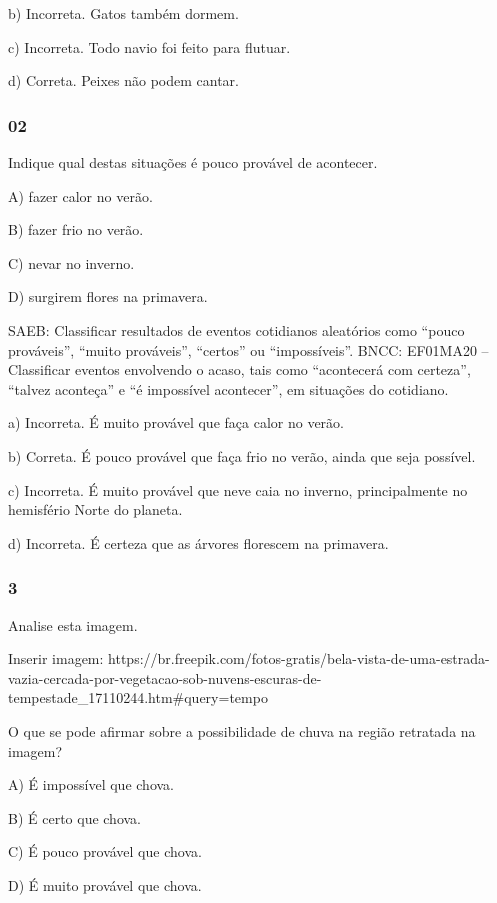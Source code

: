 b) Incorreta. Gatos também dormem.

c) Incorreta. Todo navio foi feito para flutuar.

d) Correta. Peixes não podem cantar.

\subsubsection{02}\label{section-74}

Indique qual destas situações é pouco provável de acontecer.

A) fazer calor no verão.

B) fazer frio no verão.

C) nevar no inverno.

D) surgirem flores na primavera.

SAEB: Classificar resultados de eventos cotidianos aleatórios como
``pouco prováveis'', ``muito prováveis'', ``certos'' ou ``impossíveis''.
BNCC: EF01MA20 -- Classificar eventos envolvendo o acaso, tais como
``acontecerá com certeza'', ``talvez aconteça'' e ``é impossível
acontecer'', em situações do cotidiano.

a) Incorreta. É muito provável que faça calor no verão.

b) Correta. É pouco provável que faça frio no verão, ainda que seja
possível.

c) Incorreta. É muito provável que neve caia no inverno, principalmente
no hemisfério Norte do planeta.

d) Incorreta. É certeza que as árvores florescem na primavera.

\subsubsection{3}\label{section-75}

Analise esta imagem.

Inserir imagem: https://br.freepik.com/fotos-gratis/bela-vista-de-uma-estrada-vazia-cercada-por-vegetacao-sob-nuvens-escuras-de-tempestade_17110244.htm#query=tempo%

O que se pode afirmar sobre a possibilidade de chuva na região retratada na imagem?

A) É impossível que chova.

B) É certo que chova.

C) É pouco provável que chova.

D) É muito provável que chova.

